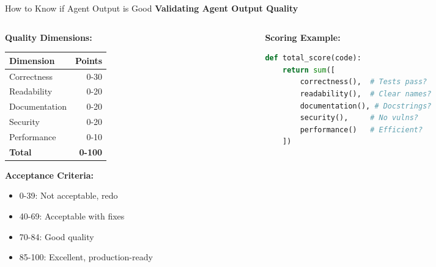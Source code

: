 \documentclass[aspectratio=169,11pt]{beamer}
\begin{document}
\begin{frame}[fragile]{How to Know if Agent Output is Good}
    \textbf{Validating Agent Output Quality}

    \begin{columns}[T]
        \begin{column}{0.48\textwidth}
            \textbf{Quality Dimensions:}

            \begin{tabular}{lr}
                \toprule
                Dimension & Points\\
                \midrule
                Correctness & 0-30\\
                Readability & 0-20\\
                Documentation & 0-20\\
                Security & 0-20\\
                Performance & 0-10\\
                \midrule
                \textbf{Total} & \textbf{0-100}\\
                \bottomrule
            \end{tabular}

            \vspace{0.3cm}
            \textbf{Acceptance Criteria:}
            \begin{itemize}
                \item 0-39: Not acceptable, redo
                \item 40-69: Acceptable with fixes
                \item 70-84: Good quality
                \item 85-100: Excellent, production-ready
            \end{itemize}
        \end{column}
        \begin{column}{0.48\textwidth}
            \textbf{Scoring Example:}
            \begin{lstlisting}[language=Python]
def total_score(code):
    return sum([
        correctness(),  # Tests pass?
        readability(),  # Clear names?
        documentation(), # Docstrings?
        security(),     # No vulns?
        performance()   # Efficient?
    ])
            \end{lstlisting}


\end{column}
\end{columns}
\end{frame}
\end{document}
